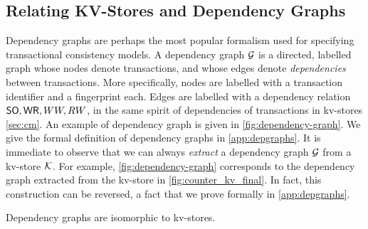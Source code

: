 \subsection{Relating KV-Stores and Dependency Graphs}
Dependency graphs \cite{adya-icde,adya} are perhaps the most popular 
formalism used for specifying transactional consistency models. 
A dependency graph $\mathcal{G}$ is a directed, labelled graph whose 
nodes denote transactions, and whose edges denote \emph{dependencies} between transactions.  
More specifically, nodes are labelled with a transaction identifier and a fingerprint each.
Edges are labelled with a dependency relation $\mathsf{SO}, \mathsf{WR}, WW, RW$, in the 
same spirit of dependencies of transactions in kv-stores \cref{sec:cm}.
An example of dependency graph is given in \cref{fig:dependency-graph}.
%
We give the formal definition of dependency graphs in \cref{app:depgraphs}.
It is immediate to observe that we can always \emph{extract} a dependency graph  $\mathcal{G}$ from a kv-store $\mathcal{K}$.
For example, \cref{fig:dependency-graph} corresponds to the dependency graph extracted from the kv-store in \cref{fig:counter_kv_final}.
In fact, this construction can be reversed, a fact that we prove formally in \cref{app:depgraphs}.
\begin{theorem}
\label{thm:kv_graph_isomorph}
Dependency graphs are isomorphic to kv-stores.
\end{theorem}

